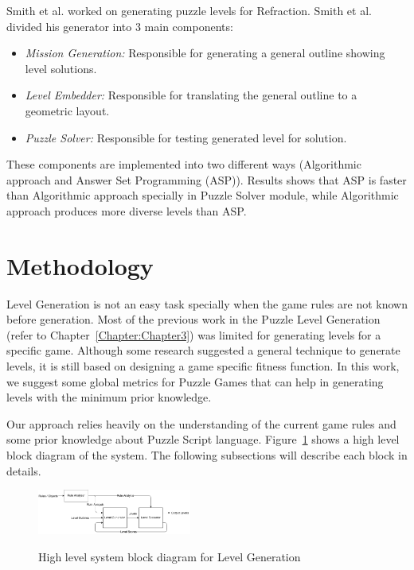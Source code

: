 \documentclass[letterpaper]{article}
\newcommand{\chref}[1]{Chapter~\ref{Chapter:#1}}
\newcommand{\figref}[1]{Figure~\ref{Figure:#1}}
\begin{document}
Smith et al.\cite{refractionStudy} worked on generating puzzle levels for Refraction\cite{refraction}. Smith et al. divided his generator into 3 main components: 
\begin{itemize}
	\item \emph{Mission Generation:} Responsible for generating a general outline showing level solutions. 
	\item \emph{Level Embedder:} Responsible for translating the general outline to a geometric layout.
	\item \emph{Puzzle Solver:} Responsible for testing generated level for solution.
\end{itemize} 
These components are implemented into two different ways (Algorithmic approach and Answer Set Programming (ASP)). Results shows that ASP is faster than Algorithmic approach specially in Puzzle Solver module, while Algorithmic approach produces more diverse levels than ASP.

\section{Methodology}
Level Generation is not an easy task specially when the game rules are not known before generation. Most of the previous work in the Puzzle Level Generation (refer to \chref{Chapter3}) was limited for generating levels for a specific game. Although some research suggested a general technique to generate levels, it is still based on designing a game specific fitness function. In this work, we suggest some global metrics for Puzzle Games that can help in generating levels with the minimum prior knowledge.\\\par

Our approach relies heavily on the understanding of the current game rules and some prior knowledge about Puzzle Script language. \figref{levelGenBlockDiagram} shows a high level block diagram of the system. The following subsections will describe each block in details.

\begin{figure}[ht]
  	\centering
    \includegraphics[width=0.45\textwidth]{Images/levelGenBlockDiagram}
    \label{Figure:levelGenBlockDiagram}
    \caption{High level system block diagram for Level Generation}
\end{figure}
\end{document}
